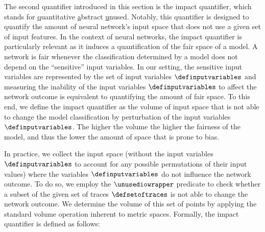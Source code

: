 The second quantifier introduced in this section is the \qlibraname{} impact quantifier, which stands for \underline{q}uantitative \underline{a}bstract \underline{u}nused.
Notably, this quantifier is designed to quantify the amount of neural network's input space that does not use a given set of input features.
In the context of neural networks, the \qlibraname{} impact quantifier is particularly relevant as it induces a quantification of the fair space of a model.
A network is fair whenever the classification determined by a model does not depend on the ``sensitive'' input variables.
In our setting, the sensitive input variables are represented by the set of input variables $\definputvariables$ and measuring the inability of the input variables $\definputvariables$ to affect the network outcome is equivalent to quantifying the amount of fair space.
To this end, we define the \qlibraname{} impact quantifier as the volume of input space that is not able to change the model classification by perturbation of the input variables $\definputvariables$.
The higher the volume the higher the fairness of the model, and thus the lower the amount of space that is prone to bias.

In practice, we collect the input space (without the input variables $\definputvariables$ to account for any possible permutations of their input values) where the variables $\definputvariables$ do not influence the network outcome.
To do so, we employ the $\unusediowrapper$ predicate to check whether a subset of the given set of traces $\defsetoftraces$ is not able to change the network outcome.
We determine the volume of this set of points by applying the standard volume operation inherent to metric spaces.
Formally, the \qlibraname{} impact quantifier is defined as follows:

